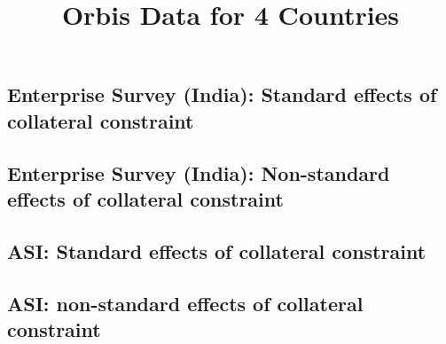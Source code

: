 \documentclass[12pt,notitlepage]{article}
\title{Orbis Data for 4 Countries}
\author{}
\date{}
\begin{document}
\maketitle

\subsection*{Enterprise Survey (India): Standard effects of collateral constraint}





\pagebreak

\subsection*{Enterprise Survey (India): Non-standard effects of collateral constraint}





\pagebreak

%
%
%
%

\subsection*{ASI: Standard effects of collateral constraint}


\pagebreak

\subsection*{ASI: non-standard effects of collateral constraint}



\end{document}
